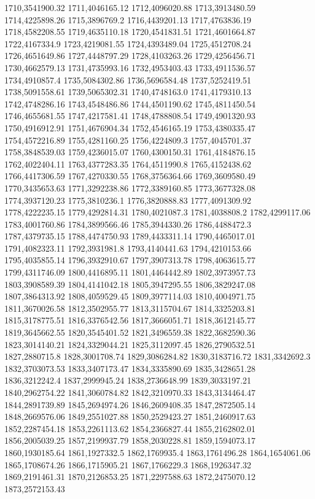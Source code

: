 1710,3541900.32
1711,4046165.12
1712,4096020.88
1713,3913480.59
1714,4225898.26
1715,3896769.2
1716,4439201.13
1717,4763836.19
1718,4582208.55
1719,4635110.18
1720,4541831.51
1721,4601664.87
1722,4167334.9
1723,4219081.55
1724,4393489.04
1725,4512708.24
1726,4651649.86
1727,4448797.29
1728,4103263.26
1729,4256456.71
1730,4662579.13
1731,4735993.16
1732,4953403.43
1733,4911536.57
1734,4910857.4
1735,5084302.86
1736,5696584.48
1737,5252419.51
1738,5091558.61
1739,5065302.31
1740,4748163.0
1741,4179310.13
1742,4748286.16
1743,4548486.86
1744,4501190.62
1745,4811450.54
1746,4655681.55
1747,4217581.41
1748,4788808.54
1749,4901320.93
1750,4916912.91
1751,4676904.34
1752,4546165.19
1753,4380335.47
1754,4572216.89
1755,4281160.25
1756,4224809.3
1757,4045701.37
1758,3848539.03
1759,4236015.07
1760,4300150.31
1761,4184876.15
1762,4022404.11
1763,4377283.35
1764,4511990.8
1765,4152438.62
1766,4417306.59
1767,4270330.55
1768,3756364.66
1769,3609580.49
1770,3435653.63
1771,3292238.86
1772,3389160.85
1773,3677328.08
1774,3937120.23
1775,3810236.1
1776,3820888.83
1777,4091309.92
1778,4222235.15
1779,4292814.31
1780,4021087.3
1781,4038808.2
1782,4299117.06
1783,4001760.86
1784,3899566.46
1785,3944330.26
1786,4488472.3
1787,4379735.15
1788,4474750.93
1789,4433311.14
1790,4465017.01
1791,4082323.11
1792,3931981.8
1793,4140441.63
1794,4210153.66
1795,4035855.14
1796,3932910.67
1797,3907313.78
1798,4063615.77
1799,4311746.09
1800,4416895.11
1801,4464442.89
1802,3973957.73
1803,3908589.39
1804,4141042.18
1805,3947295.55
1806,3829247.08
1807,3864313.92
1808,4059529.45
1809,3977114.03
1810,4004971.75
1811,3670026.58
1812,3502955.77
1813,3115704.67
1814,3325203.81
1815,3178775.51
1816,3376542.56
1817,3666051.71
1818,3612145.77
1819,3645662.55
1820,3545401.52
1821,3496559.38
1822,3682590.36
1823,3014140.21
1824,3329044.21
1825,3112097.45
1826,2790532.51
1827,2880715.8
1828,3001708.74
1829,3086284.82
1830,3183716.72
1831,3342692.3
1832,3703073.53
1833,3407173.47
1834,3335890.69
1835,3428651.28
1836,3212242.4
1837,2999945.24
1838,2736648.99
1839,3033197.21
1840,2962754.22
1841,3060784.82
1842,3210970.33
1843,3134464.47
1844,2891739.89
1845,2694974.26
1846,2609408.35
1847,2872505.14
1848,2669576.06
1849,2551027.88
1850,2529423.27
1851,2460917.63
1852,2287454.18
1853,2261113.62
1854,2366827.44
1855,2162802.01
1856,2005039.25
1857,2199937.79
1858,2030228.81
1859,1594073.17
1860,1930185.64
1861,1927332.5
1862,1769935.4
1863,1761496.28
1864,1654061.06
1865,1708674.26
1866,1715905.21
1867,1766229.3
1868,1926347.32
1869,2191461.31
1870,2126853.25
1871,2297588.63
1872,2475070.12
1873,2572153.43
